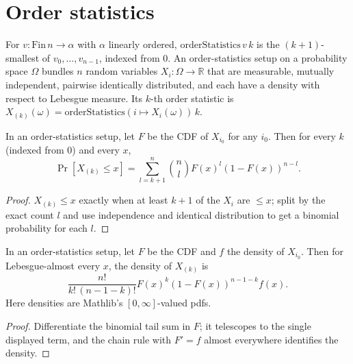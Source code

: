 \section{Order statistics}

\begin{definition}\label{def:MathEconLib.OrderStatisticsSetup}\leanok
For $v:\mathrm{Fin}\,n\to\alpha$ with $\alpha$ linearly ordered, $\mathrm{orderStatistics}\,v\,k$ is the $(k+1)$-smallest of $v_0,\dots,v_{n-1}$, indexed from $0$. An order-statistics setup on a probability space $\Omega$ bundles $n$ random variables $X_i:\Omega\to\mathbb{R}$ that are measurable, mutually independent, pairwise identically distributed, and each have a density with respect to Lebesgue measure. Its $k$-th order statistic is $X_{(k)}(\omega)=\mathrm{orderStatistics}(i\mapsto X_i(\omega))\,k$.
\end{definition}

\begin{lemma}\label{thm:MathEconLib.OrderStatisticsSetup.cdf_val}\leanok
{}
In an order-statistics setup, let $F$ be the CDF of $X_{i_0}$ for any $i_0$. Then for every $k$ (indexed from $0$) and every $x$,
\[
\Pr[X_{(k)}\le x]=\sum_{l=k+1}^{n}\binom{n}{l}F(x)^l(1-F(x))^{n-l}.
\]
\end{lemma}
\begin{proof}\leanok
$X_{(k)}\le x$ exactly when at least $k+1$ of the $X_i$ are $\le x$; split by the exact count $l$ and use independence and identical distribution to get a binomial probability for each $l$.
\end{proof}

\begin{lemma}\label{thm:MathEconLib.OrderStatisticsSetup.pdf_val}\leanok
{}
In an order-statistics setup, let $F$ be the CDF and $f$ the density of $X_{i_0}$. Then for Lebesgue-almost every $x$, the density of $X_{(k)}$ is
\[
\frac{n!}{k!\,(n-1-k)!}F(x)^k(1-F(x))^{n-1-k}f(x).
\]
Here densities are Mathlib's $[0,\infty]$-valued pdfs.
\end{lemma}
\begin{proof}\leanok
{}
Differentiate the binomial tail sum in $F$; it telescopes to the single displayed term, and the chain rule with $F'=f$ almost everywhere identifies the density.
\end{proof}

